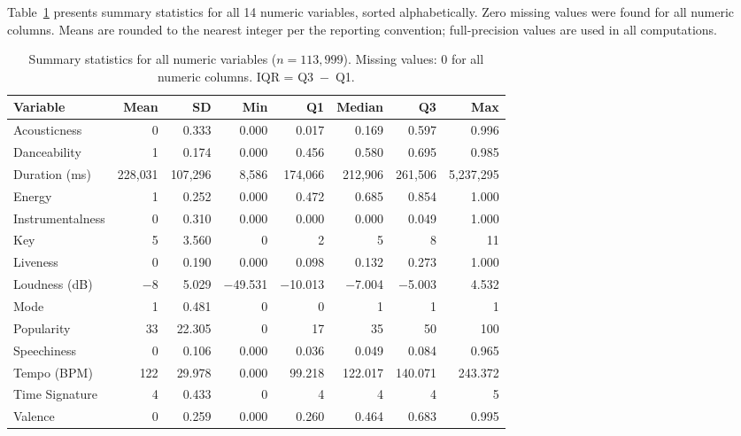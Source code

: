 \documentclass[12pt, oneside]{book}
\begin{document}
Table~\ref{tab:summary_stats} presents summary statistics for all 14 numeric variables, sorted alphabetically. Zero missing values were found for all numeric columns. Means are rounded to the nearest integer per the reporting convention; full-precision values are used in all computations.
 
\begin{table}[H]
\centering
\caption{Summary statistics for all numeric variables ($n = 113{,}999$). Missing values: 0 for all numeric columns. IQR = Q3~$-$~Q1.}
\label{tab:summary_stats}
\small
\begin{tabular}{lrrrrrrr}
\toprule
\textbf{Variable} & \textbf{Mean} & \textbf{SD} & \textbf{Min} & \textbf{Q1} & \textbf{Median} & \textbf{Q3} & \textbf{Max} \\
\midrule
Acousticness      & 0     & 0.333   & 0.000   & 0.017   & 0.169   & 0.597   & 0.996      \\
Danceability      & 1     & 0.174   & 0.000   & 0.456   & 0.580   & 0.695   & 0.985      \\
Duration (ms)     & 228{,}031 & 107{,}296 & 8{,}586 & 174{,}066 & 212{,}906 & 261{,}506 & 5{,}237{,}295 \\
Energy            & 1     & 0.252   & 0.000   & 0.472   & 0.685   & 0.854   & 1.000      \\
Instrumentalness  & 0     & 0.310   & 0.000   & 0.000   & 0.000   & 0.049   & 1.000      \\
Key               & 5     & 3.560   & 0       & 2       & 5       & 8       & 11         \\
Liveness          & 0     & 0.190   & 0.000   & 0.098   & 0.132   & 0.273   & 1.000      \\
Loudness (dB)     & $-8$  & 5.029   & $-$49.531 & $-$10.013 & $-$7.004 & $-$5.003 & 4.532    \\
Mode              & 1     & 0.481   & 0       & 0       & 1       & 1       & 1          \\
Popularity        & 33    & 22.305  & 0       & 17      & 35      & 50      & 100        \\
Speechiness       & 0     & 0.106   & 0.000   & 0.036   & 0.049   & 0.084   & 0.965      \\
Tempo (BPM)       & 122   & 29.978  & 0.000   & 99.218  & 122.017 & 140.071 & 243.372    \\
Time Signature    & 4     & 0.433   & 0       & 4       & 4       & 4       & 5          \\
Valence           & 0     & 0.259   & 0.000   & 0.260   & 0.464   & 0.683   & 0.995      \\
\bottomrule
\end{tabular}
\end{table}
 
\end{document}

